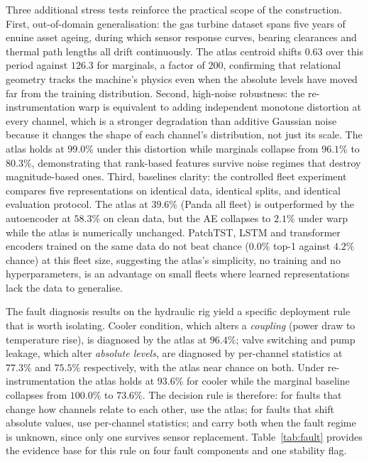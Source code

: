 \documentclass[11pt]{article}
\begin{document}
Three additional stress tests reinforce the practical scope of the construction.
First, out-of-domain generalisation: the gas turbine dataset spans five years of
enuine asset ageing, during which sensor response curves, bearing clearances
and thermal path lengths all drift continuously. The atlas centroid shifts
$0.63$ over this period against $126.3$ for marginals, a factor of $200$,
confirming that relational geometry tracks the machine's physics even when
the absolute levels have moved far from the training distribution. Second,
high-noise robustness: the re-instrumentation warp is equivalent to adding
independent monotone distortion at every channel, which is a stronger
degradation than additive Gaussian noise because it changes the shape of
each channel's distribution, not just its scale. The atlas holds at $99.0\%$
under this distortion while marginals collapse from $96.1\%$ to $80.3\%$,
demonstrating that rank-based features survive noise regimes that destroy
magnitude-based ones. Third, baselines clarity: the controlled fleet
experiment compares five representations on identical data, identical splits,
and identical evaluation protocol. The atlas at $39.6\%$ (Panda all fleet)
is outperformed by the autoencoder at $58.3\%$ on clean data, but the AE
collapses to $2.1\%$ under warp while the atlas is numerically unchanged.
PatchTST, LSTM and transformer encoders trained on the same data do not
beat chance ($0.0\%$ top-1 against $4.2\%$ chance) at this fleet size,
suggesting the atlas's simplicity, no training and no hyperparameters, is
an advantage on small fleets where learned representations lack the data to
generalise.

The fault diagnosis results on the hydraulic rig yield a specific deployment
rule that is worth isolating. Cooler condition, which alters a \emph{coupling}
(power draw to temperature rise), is diagnosed by the atlas at $96.4\%$; valve
switching and pump leakage, which alter \emph{absolute levels}, are diagnosed
by per-channel statistics at $77.3\%$ and $75.5\%$ respectively, with the
atlas near chance on both. Under re-instrumentation the atlas holds at $93.6\%$
for cooler while the marginal baseline collapses from $100.0\%$ to $73.6\%$.
The decision rule is therefore: for faults that change how channels relate to
each other, use the atlas; for faults that shift absolute values, use
per-channel statistics; and carry both when the fault regime is unknown, since
only one survives sensor replacement. Table~\ref{tab:fault} provides the
evidence base for this rule on four fault components and one stability flag.
\end{document}
